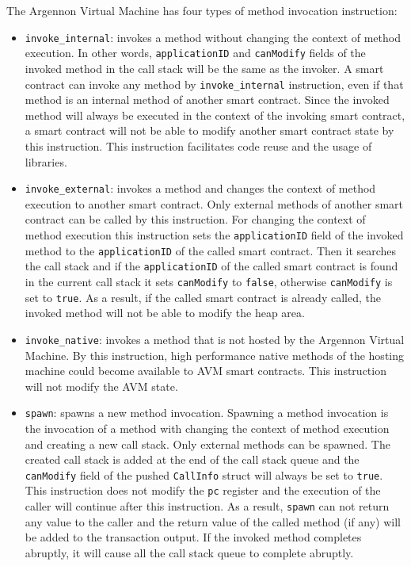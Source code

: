 \documentclass[11pt, a4paper]{report}
\begin{document}
    The Argennon Virtual Machine has four types of method invocation instruction:
    \begin{itemize}
        \item \texttt{invoke\_internal}: invokes a method without changing the context of method execution. In other
        words, \texttt{applicationID} and \texttt{canModify} fields of the invoked method in the
        call stack will be the same as the invoker.
        A smart contract can invoke any method by \texttt{invoke\_internal} instruction, even if that method is an
        internal method of another smart contract. Since the invoked method will always be executed in the context of
        the invoking smart contract, a smart contract will not be able to modify another smart contract state by
        this instruction. This instruction facilitates code reuse and the usage of libraries.
        \item \texttt{invoke\_external}: invokes a method and changes the context of method execution to another
        smart contract. Only external methods of another smart contract can be called by this instruction. For changing
        the context of method execution this instruction sets the \texttt{applicationID} field of the invoked method
        to the \texttt{applicationID} of the called smart contract. Then it searches the call stack and if
        the \texttt{applicationID} of the called smart contract is found in the current call stack it sets
        \texttt{canModify} to \texttt{false}, otherwise \texttt{canModify} is set to \texttt{true}.
        As a result, if the called smart contract is already called, the invoked method will not be
        able to modify the heap area.
        \item \texttt{invoke\_native}: invokes a method that is not hosted by the Argennon Virtual Machine. By this
        instruction, high performance native methods of the hosting machine could become available to AVM smart
        contracts. This instruction will not modify the AVM state.
        \item \texttt{spawn}: spawns a new method invocation. Spawning a method invocation is the invocation of a method
        with changing the context of method execution and creating a new call stack. Only external methods can
        be spawned. The created call stack is added at the end of the call stack queue and
        the \texttt{canModify} field of the pushed \texttt{CallInfo} struct will always
        be set to \texttt{true}. This instruction does not modify the \texttt{pc} register and the execution of the
        caller will continue after this instruction. As a result, \texttt{spawn} can not return
        any value to the caller and the return value of the called method (if any) will be added
        to the transaction output. If the invoked method completes abruptly, it will cause all the call stack queue to
        complete abruptly.
    \end{itemize}
\end{document}
